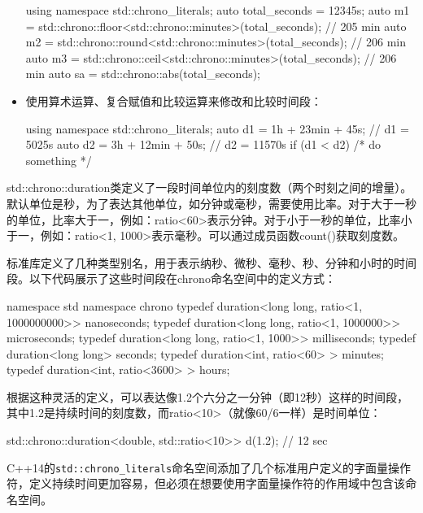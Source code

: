 \begin{itemize}
\begin{cpp}
using namespace std::chrono_literals;
auto total_seconds = 12345s;
auto m1 = std::chrono::floor<std::chrono::minutes>(total_seconds);
// 205 min
auto m2 = std::chrono::round<std::chrono::minutes>(total_seconds);
// 206 min
auto m3 = std::chrono::ceil<std::chrono::minutes>(total_seconds);
// 206 min
auto sa = std::chrono::abs(total_seconds);
\end{cpp}

\item
使用算术运算、复合赋值和比较运算来修改和比较时间段：

\begin{cpp}
using namespace std::chrono_literals;
auto d1 = 1h + 23min + 45s; // d1 = 5025s
auto d2 = 3h + 12min + 50s; // d2 = 11570s
if (d1 < d2) { /* do something */ }
\end{cpp}
\end{itemize}


std::chrono::duration类定义了一段时间单位内的刻度数（两个时刻之间的增量）。默认单位是秒，为了表达其他单位，如分钟或毫秒，需要使用比率。对于大于一秒的单位，比率大于一，例如：ratio<60>表示分钟。对于小于一秒的单位，比率小于一，例如：ratio<1, 1000>表示毫秒。可以通过成员函数count()获取刻度数。

标准库定义了几种类型别名，用于表示纳秒、微秒、毫秒、秒、分钟和小时的时间段。以下代码展示了这些时间段在chrono命名空间中的定义方式：

\begin{cpp}
namespace std {
    namespace chrono {
        typedef duration<long long, ratio<1, 1000000000>> nanoseconds;
        typedef duration<long long, ratio<1, 1000000>> microseconds;
        typedef duration<long long, ratio<1, 1000>> milliseconds;
        typedef duration<long long> seconds;
        typedef duration<int, ratio<60> > minutes;
        typedef duration<int, ratio<3600> > hours;
    }
}
\end{cpp}

根据这种灵活的定义，可以表达像1.2个六分之一分钟（即12秒）这样的时间段，其中1.2是持续时间的刻度数，而ratio<10>（就像60/6一样）是时间单位：

\begin{cpp}
std::chrono::duration<double, std::ratio<10>> d(1.2); // 12 sec
\end{cpp}

C++14的\verb|std::chrono_literals|命名空间添加了几个标准用户定义的字面量操作符，定义持续时间更加容易，但必须在想要使用字面量操作符的作用域中包含该命名空间。

